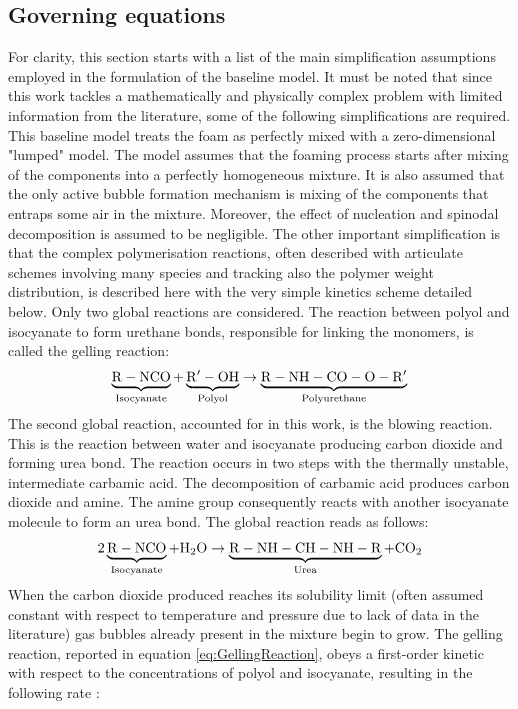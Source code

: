 \subsection{Governing equations}
%
For clarity, this section starts with a list of the main simplification assumptions employed in the formulation of the baseline model. 
It must be noted that since this work tackles a mathematically and physically complex problem with limited information from the literature, some of the following simplifications are required. 
This baseline model treats the foam as perfectly mixed with a zero-dimensional "lumped" model. 
The model assumes that the foaming process starts after mixing of the components into a perfectly homogeneous mixture. 
It is also assumed that the only active bubble formation mechanism is mixing of the components that entraps some air in the mixture. Moreover, the effect of nucleation and spinodal decomposition is assumed to be negligible. 
The other important simplification is that the complex polymerisation reactions, often described with articulate schemes involving many species and tracking also the polymer weight distribution, is described here with the very simple kinetics scheme detailed below.   
Only two global reactions are considered. The reaction between polyol and isocyanate to form urethane bonds, responsible for linking the monomers, is called the gelling reaction: 
\begin{equation}
    \underbrace{\mathrm{R}-\mathrm{N}\mathrm{C}\mathrm{O}}_{\text{Isocyanate}}+\underbrace{\mathrm{R'}-\mathrm{O}\mathrm{H}}_{\text{Polyol}}\rightarrow\underbrace{\mathrm{R}-\mathrm{N}\mathrm{H}-\mathrm{C}\mathrm{O}-\mathrm{O}-\mathrm{R'}}_{\text{Polyurethane}} \label{eq:GellingReaction}
\end{equation}
The second global reaction, accounted for in this work, is the blowing reaction. 
This is the reaction between water and isocyanate producing carbon dioxide and forming urea bond. The reaction occurs in two steps with the thermally unstable, intermediate carbamic acid. The decomposition of carbamic acid produces carbon dioxide and amine. The amine group consequently reacts with another isocyanate molecule to form an urea bond. The global reaction reads as follows:  
\begin{equation}
    2\underbrace{\mathrm{R}-\mathrm{N}\mathrm{C}\mathrm{O}}_{\text{Isocyanate}}+\mathrm{H}_2\mathrm{O}\rightarrow\underbrace{\mathrm{R}-\mathrm{N}\mathrm{H}-\mathrm{C}\mathrm{H}-\mathrm{N}\mathrm{H}-\mathrm{R}}_{\text{Urea}}+\mathrm{C}\mathrm{O}_2 \label{eq:GlobalReaction}
\end{equation}
When the carbon dioxide produced reaches its solubility limit (often assumed constant with respect to temperature and pressure due to lack of data in the literature) gas bubbles already present in the mixture begin to grow.  
The gelling reaction, reported in equation \ref{eq:GellingReaction}, obeys a first-order kinetic with respect to the concentrations of polyol and isocyanate, resulting in the following rate \cite{winkler_1993,baser_and_khakhar_1994_a,baser_and_khakhar_1994_b,greier_and_piesche_etal_2009}:
